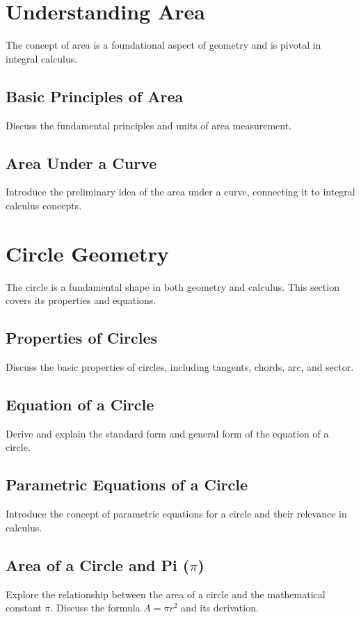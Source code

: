\documentclass[a4paper,12pt]{book}
\begin{document}
\section{Understanding Area}
\label{sec:understanding_area}
The concept of area is a foundational aspect of geometry and is pivotal in integral calculus.


\subsection{Basic Principles of Area}
\label{subsec:basic_principles_area}
Discuss the fundamental principles and units of area measurement.


\subsection{Area Under a Curve}
\label{subsec:area_under_curve}
Introduce the preliminary idea of the area under a curve, connecting it to integral calculus concepts.


\section{Circle Geometry}
\label{sec:circle_geometry}
The circle is a fundamental shape in both geometry and calculus. This section covers its properties and equations.


\subsection{Properties of Circles}
\label{subsec:properties_of_circles}
Discuss the basic properties of circles, including tangents, chords, arc, and sector.


\subsection{Equation of a Circle}
\label{subsec:equation_of_a_circle}
Derive and explain the standard form and general form of the equation of a circle.


\subsection{Parametric Equations of a Circle}
\label{subsec:parametric_equations_circle}
Introduce the concept of parametric equations for a circle and their relevance in calculus.


\subsection{Area of a Circle and Pi (\(\pi\))}
\label{subsec:area_circle_pi}
Explore the relationship between the area of a circle and the mathematical constant \(\pi\). Discuss the formula \(A = \pi r^2\) and its derivation.
\end{document}
